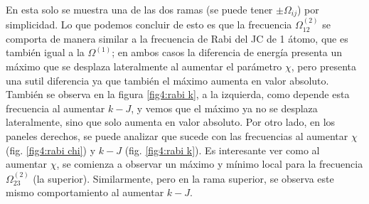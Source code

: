 En esta solo se muestra una de las dos ramas (se puede tener $\pm \Omega_{ij}$) por simplicidad. Lo que podemos concluir de esto es que la frecuencia $\Omega^(2)_{12}$ se comporta de manera similar a la frecuencia de Rabi del JC de 1 átomo, que es también igual a la $\Omega^(1)$; en ambos casos la diferencia de energía presenta un máximo que se desplaza lateralmente al aumentar el parámetro $\chi$, pero presenta una sutil diferencia ya que también el máximo aumenta en valor absoluto. También se observa en la figura \ref{fig4:rabi k}, a la izquierda, como depende esta frecuencia al aumentar $k-J$, y vemos que el máximo ya no se desplaza lateralmente, sino que solo aumenta en valor absoluto. Por otro lado, en los paneles derechos, se puede analizar que sucede con las frecuencias al aumentar $\chi$ (fig. \ref{fig4:rabi chi}) y $k-J$ (fig. \ref{fig4:rabi k}). Es interesante ver como al aumentar $\chi$, se comienza a observar un máximo y mínimo local para la frecuencia $\Omega^{(2)}_{23}$ (la superior). Similarmente, pero en la rama superior, se observa este mismo comportamiento al aumentar $k-J$.

